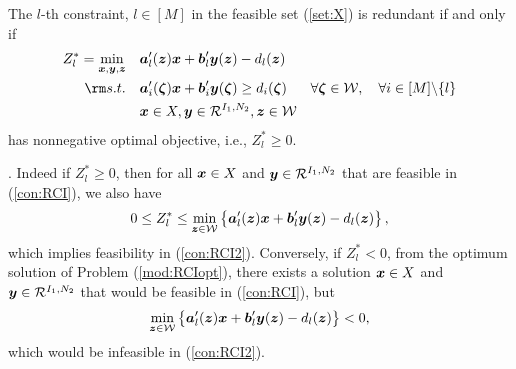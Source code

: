 \documentclass[fleqn,isre,blindrev]{informs4}
\newcommand{\mb}[1]{\mbox{\boldmath \ensuremath{#1}}}
\newcommand{\mbs}[1]{\mb{\scriptstyle{#1}}}
\begin{document}
		\begin{theorem} \label{thm:RCIExact}
			The $l$-th constraint, $l \in [M]$  in the feasible set (\ref{set:X}) is redundant if and only if
\begin{equation} \label{mod:RCIopt}
				\begin{aligned} 
					Z^*_l=	\min_{ \boldsymbol{x}  , \boldsymbol{y}, \boldsymbol{z}} \quad & \mb{a}'_l(\mb{z})\mb{x}+\mb{b}'_l \mb{y}(\mb{z}) - d_l(\mb{z}) \\
					{\rm s.t.}  \quad &\mb{a}'_i(\mb{\zeta})\mb{x}+\mb{b}'_i \mb{y}(\mb{\zeta}) \geq d_i(\mb{\zeta}) &  \forall  \mb{\zeta} \in  \mathcal{W}, \quad \forall i  \in [M] \backslash \{l\} \\
					\quad & \boldsymbol{x} \in X, \boldsymbol{y} \in   \mathcal{R}^{I_1,N_2},  \mb{z} \in \mathcal{W}
				\end{aligned}
\end{equation}
			has nonnegative optimal objective, i.e.,  $Z^*_l\geq 0$. 
		\end{theorem}
		. 
		Indeed if  $Z^*_l\geq 0$, then for  all $\mb{x} \in X$ and $\mb{y}\in \mathcal{R}^{I_1,N_2}$ that are feasible in (\ref{con:RCI}), we also have
\begin{equation*}
		0 \le  Z^*_l  \le  \min_{\mbs{z} \in \mathcal{W}}  \left\{  \mb{a}'_l(\mb{z})\mb{x}+\mb{b}'_l \mb{y}(\mb{z}) - d_l(\mb{z})  \right\},
\end{equation*}
		which implies feasibility in (\ref{con:RCI2}). Conversely, if $Z^*_l <0$, from the optimum solution of  Problem (\ref{mod:RCIopt}), there exists  a solution  $\mb{x} \in X$ and $\mb{y} \in \mathcal{R}^{I_1,N_2}$ that would be feasible in (\ref{con:RCI}), but\vadjust{\pagebreak}
\begin{equation*}
		\min_{\mbs{z} \in \mathcal{W}} \left\{  \mb{a}'_l(\mb{z})\mb{x}+\mb{b}'_l \mb{y}(\mb{z}) - d_l(\mb{z}) \right\} < 0, 
\end{equation*}
		which would be infeasible in (\ref{con:RCI2}).
		 \hfill \Halmos\\
		
\end{document}
